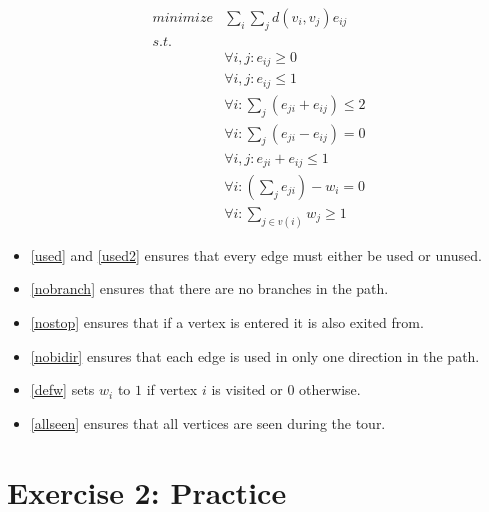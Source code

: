\documentclass[11pt,a4paper]{article}
\begin{document}
\begin{align}
    minimize & \sum_i \sum_j d(v_i, v_j) e_{ij} \nonumber \\
    s.t.     & \nonumber \\ 
             & \forall i, j: e_{ij} \geq 0 \label{used} \\
             & \forall i, j: e_{ij} \leq 1 \label{used2} \\
             & \forall i: \sum_j (e_{ji} + e_{ij}) \leq 2 \label{nobranch} \\
             & \forall i: \sum_j (e_{ji} - e_{ij}) = 0 \label{nostop}\\
             & \forall i,j: e_{ji} + e_{ij} \leq 1 \label{nobidir} \\
             & \forall i: (\sum_j e_{ji}) - w_i = 0 \label{defw} \\
             & \forall i: \sum_{j \in v(i)} w_j \geq 1 \label{allseen}
\end{align}

\begin{itemize}
    \item \autoref{used} and \autoref{used2} ensures that every edge must either be used or unused.
    \item \autoref{nobranch} ensures that there are no branches in the path.
    \item \autoref{nostop} ensures that if a vertex is entered it is also exited from.
    \item \autoref{nobidir} ensures that each edge is used in only one direction in the path.
    \item \autoref{defw} sets $w_i$ to $1$ if vertex $i$ is visited or $0$ otherwise.
    \item \autoref{allseen} ensures that all vertices are seen during the tour.
\end{itemize}


\section{Exercise 2: Practice}
\end{document}

